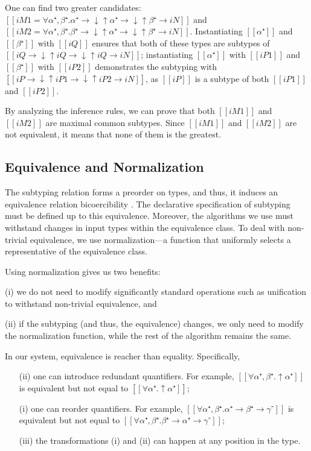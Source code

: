 One can find two greater candidates:
$[[iM1 = ∀α⁺,β⁺. α⁺ → ↓↑α⁺ → ↓↑β⁺ → iN]]$ and $[[iM2 = ∀α⁺,β⁺. β⁺ → ↓↑α⁺ → ↓↑β⁺ → iN]]$.
Instantiating $[[α⁺]]$ and $[[β⁺]]$ with $[[iQ]]$ ensures 
that both of these types are subtypes of $[[iQ → ↓↑iQ → ↓↑iQ → iN]]$;
instantiating $[[α⁺]]$ with $[[iP1]]$ and $[[β⁺]]$ with $[[iP2]]$
demonstrates the subtyping with $[[iP → ↓↑iP1 → ↓↑iP2 → iN]]$,
as $[[iP]]$ is a subtype of both $[[iP1]]$ and $[[iP2]]$.

By analyzing the inference rules, we can prove that
both $[[iM1]]$ and $[[iM2]]$ are maximal common subtypes.
Since $[[iM1]]$ and $[[iM2]]$ are not equivalent,
it means that none of them is the greatest.


\subsection{Equivalence and Normalization}
\label{sec:decl-equivalence}

The subtyping relation forms a preorder on types,
and thus, it induces an equivalence relation \aka bicoercibility 
\cite{tiuryn1995:bicoercibility}.
The declarative specification of subtyping must be defined up to this equivalence.
Moreover, the algorithms we use must withstand changes in input types within the equivalence class.
To deal with non-trivial equivalence, 
we use normalization---a function that uniformly selects a representative of the equivalence class.

Using normalization gives us two benefits:
\begin{enumerate*}
  \item [(i)] we do not need to modify significantly standard operations such as unification to withstand non-trivial equivalence, and
  \item [(ii)] if the subtyping (and thus, the equivalence) changes, we only need to modify the normalization function, 
    while the rest of the algorithm remains the same.
\end{enumerate*}

In our system, equivalence is reacher than equality. Specifically,
\begin{enumerate}
  \item[(ii)] one can introduce redundant quantifiers. For example, $[[∀α⁺,β⁺.↑α⁺]]$ is equivalent
  but not equal to $[[∀α⁺.↑α⁺]]$;
  \item[(i)] one can reorder quantifiers. For example, $[[∀α⁺,β⁺.α⁺ → β⁺ → γ⁻]]$ is equivalent but not equal to
  $[[∀α⁺,β⁺.β⁺ → α⁺ → γ⁻]]$; 
  \item[(iii)] the transformations (i) and (ii) can happen at any
    position in the type.
\end{enumerate}

